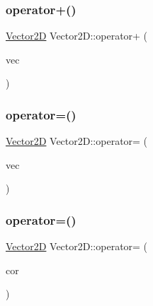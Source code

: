 \subsubsection{\texorpdfstring{operator+()}{operator+()}}
{\footnotesize\ttfamily \mbox{\hyperlink{classsc_1_1_vector2_d}{Vector2D}} Vector2\+D\+::operator+ (\begin{DoxyParamCaption}\item[{\mbox{\hyperlink{classsc_1_1_vector2_d}{Vector2D}} const \&}]{vec }\end{DoxyParamCaption})}

\mbox{\label{classsc_1_1_vector2_d_acb37f78eb97a116c0a730d0b9d29d13c}} 
\subsubsection{\texorpdfstring{operator=()}{operator=()}\hspace{0.1cm}{\footnotesize\ttfamily [1/2]}}
{\footnotesize\ttfamily \mbox{\hyperlink{classsc_1_1_vector2_d}{Vector2D}} Vector2\+D\+::operator= (\begin{DoxyParamCaption}\item[{\mbox{\hyperlink{classsc_1_1_vector2_d}{Vector2D}} const \&}]{vec }\end{DoxyParamCaption})}

\mbox{\label{classsc_1_1_vector2_d_a8ea3728d35dea49a06d469f279764535}} 
\subsubsection{\texorpdfstring{operator=()}{operator=()}\hspace{0.1cm}{\footnotesize\ttfamily [2/2]}}
{\footnotesize\ttfamily \mbox{\hyperlink{classsc_1_1_vector2_d}{Vector2D}} Vector2\+D\+::operator= (\begin{DoxyParamCaption}\item[{C\+O\+O\+RD const \&}]{cor }\end{DoxyParamCaption})}

\mbox{\label{classsc_1_1_vector2_d_ae9545c1e00d00d200ce6f4f361a8aab4}} 
